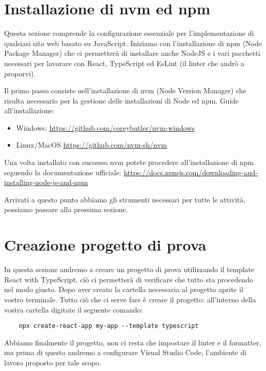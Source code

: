 \section{Installazione di nvm ed npm}
Questa sezione comprende la configurazione essenziale per l'implementazione di
qualsiasi sito web basato su JavaScript. Iniziamo con l'installazione
di npm (Node Package Manager) che ci permetterà di installare anche NodeJS e i vari pacchetti necessari per lavorare con React, TypeScript ed EsLint (il linter che andrò a proporvi).

Il primo passo consiste nell'installazione di nvm (Node Version Manager) che risulta necessario per la gestione delle installazioni di Node ed npm. Guide
all'installazione:
\begin{itemize}
    \item Windows: \url{https://github.com/coreybutler/nvm-windows}
    \item Linux/MacOS \url{https://github.com/nvm-sh/nvm}
\end{itemize}

Una volta installato con successo nvm potete procedere all'installazione di npm seguendo la documentazione ufficiale: \url{https://docs.npmjs.com/downloading-and-installing-node-js-and-npm}

\bigskip

Arrivati a questo punto abbiamo gli strumenti necessari per tutte le attività, possiamo passare alla prossima sezione.

\section{Creazione progetto di prova}
In questa sezione andremo a creare un progetto di prova utilizzando il template React with TypeScript, ciò ci permetterà di verificare che tutto sta procedendo nel modo giusto. Dopo aver creato la cartella necessaria al progetto aprite il vostro terminale. Tutto ciò che ci serve fare è creare il progetto: all'interno della vostra cartella digitate il seguente comando:
\begin{verbatim}
    npx create-react-app my-app --template typescript
\end{verbatim}
Abbiamo finalmente il progetto, non ci resta che impostare il linter e il formatter, ma prima di questo andremo a configurare Visual Studio Code, l'ambiente di lavoro proposto per tale scopo.

